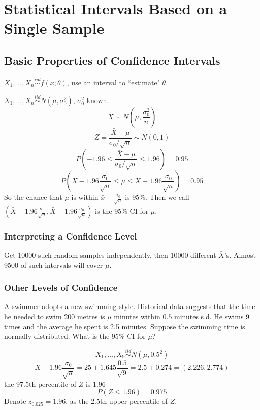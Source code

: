 \chapter[Statistical Intervals]{Statistical Intervals Based on a Single Sample}
\section{Basic Properties of Confidence Intervals}
$X_1,\dots,X_n \overset{iid}{\sim} f(x;\theta)$, use an interval to ``estimate" $\theta$.

\begin{exmp}
$X_1,\dots,X_n \overset{iid}{\sim} N(\mu,\sigma_0^2)$, $\sigma_0^2$ known.
\[\bar{X}\sim N\left(\mu,\frac{\sigma_0^2}{n}\right)\]
\[Z=\frac{\bar{X}-\mu}{\sigma_0/\sqrt{n}}\sim N(0,1)\]
\[P\left(-1.96\leq \frac{\bar{X}-\mu}{\sigma_0/\sqrt{n}} \leq 1.96 \right) =0.95\]
\[P\left(\bar{X}-1.96 \frac{\sigma_0}{\sqrt{n}} \leq \mu \leq \bar{X}+1.96 \frac{\sigma_0}{\sqrt{n}} \right) =0.95\]
So the chance that $\mu$ is within $\bar{x}\pm \frac{\sigma_0}{\sqrt{n}} $ is 95\%. Then we call $\left(\bar{X}-1.96 \frac{\sigma_0}{\sqrt{n}},\bar{X}+1.96 \frac{\sigma_0}{\sqrt{n}} \right)$ is the 95\% CI for $\mu$.
\end{exmp}

\subsection{Interpreting a Confidence Level}
Get 10000 such random samples independently, then 10000 different $\bar{X}$'s. Almost 9500 of such intervals will cover $\mu$.

\subsection{Other Levels of Confidence}

\begin{exmp}
A swimmer adopts a new swimming style. Historical data suggests that the time he needed to swim 200 metres is $\mu$ minutes within $0.5$ minutes s.d. He swims 9 times and the average he spent is 2.5 minutes. Suppose the swimming time is normally distributed. What is the 95\% CI for $\mu$?

\[X_1,\dots,X_9 \overset{iid}{\sim} N(\mu,0.5^2)\]
\[\bar{X}\pm 1.96 \frac{\sigma_0}{\sqrt{n}}=25 \pm 1.645 \frac{0.5}{\sqrt{9}}=2.5 \pm 0.274=(2.226,2.774) \]
the 97.5th percentile of $Z$ is 1.96 
\[P(Z \leq 1.96)=0.975\]
Denote $z_{0.025}=1.96$, as the 2.5th upper percentile of $Z$.
\end{exmp}

